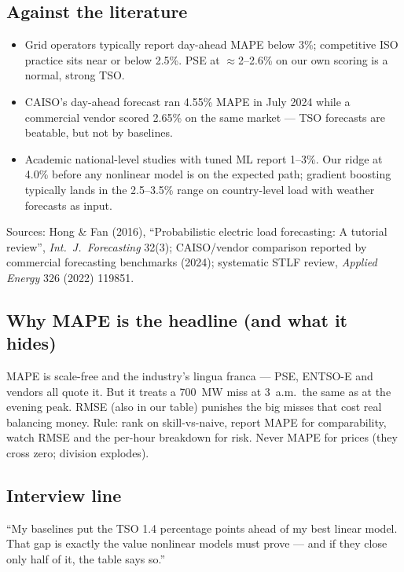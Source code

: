 \subsection{Against the literature}

\begin{itemize}
  \item Grid operators typically report day-ahead MAPE below 3\%; competitive
        ISO practice sits near or below 2.5\%. PSE at $\approx$2--2.6\% on our
        own scoring is a normal, strong TSO.
  \item CAISO's day-ahead forecast ran 4.55\% MAPE in July 2024 while a
        commercial vendor scored 2.65\% on the same market --- TSO forecasts
        are beatable, but not by baselines.
  \item Academic national-level studies with tuned ML report 1--3\%.
        Our ridge at 4.0\% before any nonlinear model is on the expected path;
        gradient boosting typically lands in the 2.5--3.5\% range on
        country-level load with weather forecasts as input.
\end{itemize}

Sources: Hong \& Fan (2016), ``Probabilistic electric load forecasting:
A tutorial review'', \emph{Int.\ J.\ Forecasting} 32(3); CAISO/vendor
comparison reported by commercial forecasting benchmarks (2024); systematic
STLF review, \emph{Applied Energy} 326 (2022) 119851.

\subsection{Why MAPE is the headline (and what it hides)}

MAPE is scale-free and the industry's lingua franca --- PSE, ENTSO-E and
vendors all quote it. But it treats a 700~MW miss at 3~a.m.\ the same as at
the evening peak. RMSE (also in our table) punishes the big misses that cost
real balancing money. Rule: rank on skill-vs-naive, report MAPE for
comparability, watch RMSE and the per-hour breakdown for risk. Never MAPE
for prices (they cross zero; division explodes).

\subsection{Interview line}

``My baselines put the TSO 1.4 percentage points ahead of my best linear
model. That gap is exactly the value nonlinear models must prove --- and if
they close only half of it, the table says so.''

